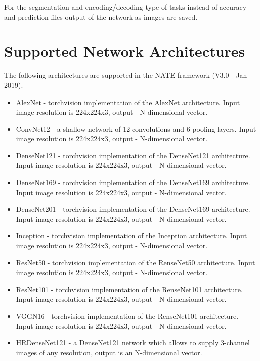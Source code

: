 \documentclass[a4paper, 11pt]{article}
\begin{document}
For the segmentation and encoding/decoding type of tasks instead of accuracy and prediction files output of the network as images are saved.   


\section{Supported Network Architectures}
\label{nnarch}
The following architectures are supported in the NATE framework (V3.0 - Jan 2019).

\begin{itemize}
    \item AlexNet - torchvision implementation of the AlexNet architecture. Input image resolution is 224x224x3, output - N-dimensional vector.
    \item ConvNet12 - a shallow network of 12 convolutions and 6 pooling layers. Input image resolution is 224x224x3, output - N-dimensional vector.
    \item DenseNet121 - torchvision implementation of the DenseNet121 architecture. Input image resolution is 224x224x3, output - N-dimensional vector.
    \item DenseNet169 - torchvision implementation of the DenseNet169 architecture. Input image resolution is 224x224x3, output - N-dimensional vector.
    \item DenseNet201 - torchvision implementation of the DenseNet169 architecture. Input image resolution is 224x224x3, output - N-dimensional vector.
    \item Inception - torchvision implementation of the Inception architecture. Input image resolution is 224x224x3, output - N-dimensional vector.
    \item ResNet50 - torchvision implementation of the RenseNet50 architecture. Input image resolution is 224x224x3, output - N-dimensional vector.
    \item ResNet101 - torchvision implementation of the RenseNet101 architecture. Input image resolution is 224x224x3, output - N-dimensional vector.
    \item VGGN16 - torchvision implementation of the RenseNet101 architecture. Input image resolution is 224x224x3, output - N-dimensional vector.
    \item HRDenseNet121 - a DenseNet121 network which allows to supply 3-channel images of any resolution, output is an N-dimensional vector. 

\end{itemize}
\end{document}

